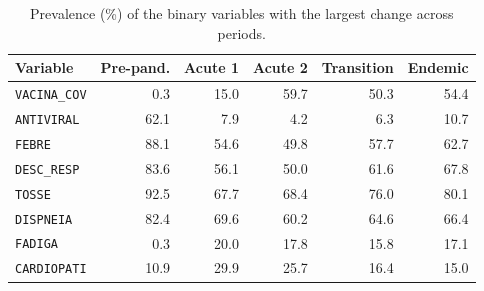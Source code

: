 \begin{table}
  \small
  \caption{Prevalence (\%) of the binary variables with the largest change across periods.}
  \label{tab:feature-shift}
  \begin{tabular}{lrrrrr}
    \toprule
    Variable & Pre-pand. & Acute 1 & Acute 2 & Transition & Endemic \\
    \midrule
    \texttt{VACINA\_COV} & 0.3 & 15.0 & 59.7 & 50.3 & 54.4 \\
    \texttt{ANTIVIRAL} & 62.1 & 7.9 & 4.2 & 6.3 & 10.7 \\
    \texttt{FEBRE} & 88.1 & 54.6 & 49.8 & 57.7 & 62.7 \\
    \texttt{DESC\_RESP} & 83.6 & 56.1 & 50.0 & 61.6 & 67.8 \\
    \texttt{TOSSE} & 92.5 & 67.7 & 68.4 & 76.0 & 80.1 \\
    \texttt{DISPNEIA} & 82.4 & 69.6 & 60.2 & 64.6 & 66.4 \\
    \texttt{FADIGA} & 0.3 & 20.0 & 17.8 & 15.8 & 17.1 \\
    \texttt{CARDIOPATI} & 10.9 & 29.9 & 25.7 & 16.4 & 15.0 \\
    \bottomrule
  \end{tabular}
\end{table}
